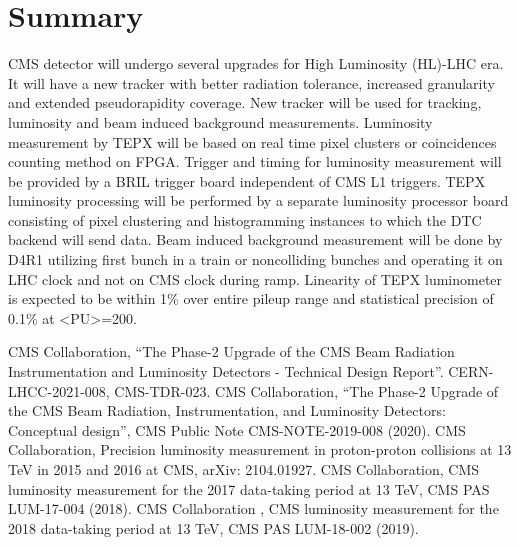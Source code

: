 \documentclass[a4paper,11pt]{article}
\begin{document}
\section{Summary}
CMS detector will undergo several upgrades for High Luminosity (HL)-LHC era. It will have a new tracker with better radiation tolerance, increased granularity and extended pseudorapidity coverage. New tracker will be used for tracking, luminosity and beam induced background measurements. Luminosity measurement by TEPX will be based on real time pixel clusters or coincidences counting method on FPGA. Trigger and timing for luminosity measurement will be provided by a BRIL trigger board independent of CMS L1 triggers. TEPX luminosity processing will be performed by a separate luminosity processor board consisting of pixel clustering and histogramming instances to which the DTC backend will send data. Beam induced background measurement will be done by D4R1 utilizing first bunch in a train or noncolliding bunches and operating it on LHC clock and not on CMS clock during ramp. Linearity of TEPX luminometer is expected to be within 1\% over entire pileup range and statistical precision of 0.1\% at <PU>=200.


\begin{thebibliography}{99}
CMS Collaboration, “The Phase-2 Upgrade of the CMS Beam Radiation
Instrumentation and Luminosity Detectors - Technical Design Report”.
CERN-LHCC-2021-008, CMS-TDR-023.
CMS Collaboration, “The Phase-2 Upgrade of the CMS Beam Radiation,
Instrumentation, and Luminosity Detectors: Conceptual design”, CMS Public
Note CMS-NOTE-2019-008 (2020).
CMS Collaboration, Precision luminosity measurement in proton-proton
collisions at 13 TeV in 2015 and 2016 at CMS, arXiv: 2104.01927.
CMS Collaboration, CMS luminosity measurement for the 2017 data-taking
period at 13 TeV, CMS PAS LUM-17-004 (2018).
CMS Collaboration , CMS luminosity measurement for the 2018 data-taking
period at 13 TeV, CMS PAS LUM-18-002 (2019).

\end{thebibliography}
\end{document}
